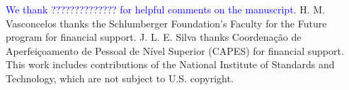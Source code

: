 \documentclass[
reprint,
superscriptaddress,
showpacs,
amsmath,
amssymb,
aps,
pra,
longbibliography
]{revtex4-1}
\providecommand{\editcolor}[2]{\textcolor{#1}{#2}}
\providecommand{\editcolor}[2]{#2}
\newcommand{\HV}[1]{\editcolor{blue}{#1}}
\begin{document}
\begin{acknowledgments}
  \HV{We thank ?????????????? for
    helpful comments on the manuscript.}  H. M. Vasconcelos thanks the
  Schlumberger Foundation's Faculty for the Future program for
  financial support. J. L. E. Silva thanks Coordena\c c\~ao de
  Aperfei\c coamento de Pessoal de N\'ivel Superior (CAPES) for
  financial support. This work includes contributions of the National
  Institute of Standards and Technology, which are not subject to
  U.S. copyright.
\end{acknowledgments}




%


\end{document}
